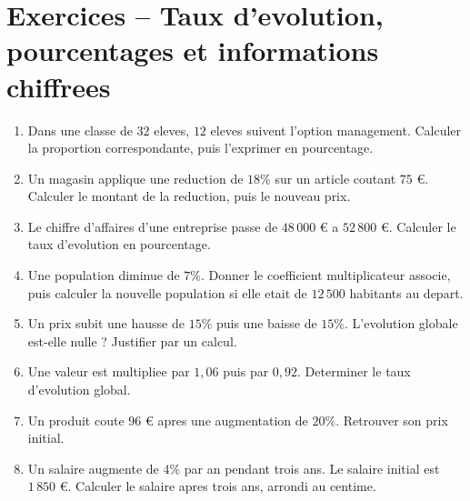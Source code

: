 \documentclass[french,11pt]{book}
\newcommand{\pourcent}{\%}
\begin{document}
\chapter*{Exercices -- Taux d'evolution, pourcentages et informations chiffrees}

\begin{enumerate}
\item Dans une classe de $32$ eleves, $12$ eleves suivent l'option management. Calculer la proportion correspondante, puis l'exprimer en pourcentage.

\item Un magasin applique une reduction de $18\pourcent$ sur un article coutant $75$ \euro{}. Calculer le montant de la reduction, puis le nouveau prix.

\item Le chiffre d'affaires d'une entreprise passe de $48\,000$ \euro{} a $52\,800$ \euro{}. Calculer le taux d'evolution en pourcentage.

\item Une population diminue de $7\pourcent$. Donner le coefficient multiplicateur associe, puis calculer la nouvelle population si elle etait de $12\,500$ habitants au depart.

\item Un prix subit une hausse de $15\pourcent$ puis une baisse de $15\pourcent$. L'evolution globale est-elle nulle ? Justifier par un calcul.

\item Une valeur est multipliee par $1{,}06$ puis par $0{,}92$. Determiner le taux d'evolution global.

\item Un produit coute $96$ \euro{} apres une augmentation de $20\pourcent$. Retrouver son prix initial.

\item Un salaire augmente de $4\pourcent$ par an pendant trois ans. Le salaire initial est $1\,850$ \euro{}. Calculer le salaire apres trois ans, arrondi au centime.
\end{enumerate}
\end{document}
